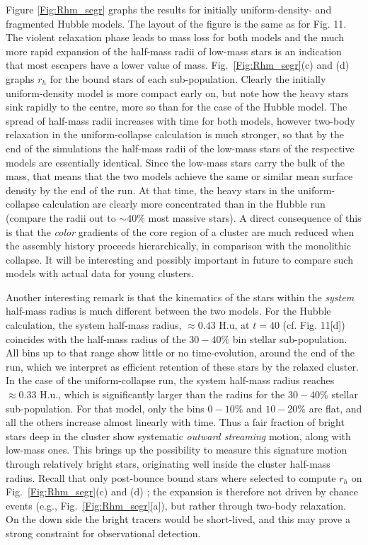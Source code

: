 Figure \ref{Fig:Rhm_segr} graphs the results for initially uniform-density- and fragmented Hubble models. The layout of the figure is the same as for Fig. 11. The violent relaxation phase leads to mass loss for both models and the much more rapid expansion of the half-mass radii of low-mass stars is an indication that most escapers have a lower value of mass. Fig.~\ref{Fig:Rhm_segr}(c) and (d) graphs $r_h$ for the bound stars of each sub-population. Clearly the initially uniform-density model is more compact early on, but note how the heavy stars sink rapidly to the centre, more so than for the case of the Hubble model. The spread of half-mass radii increases with time for both models, however two-body relaxation in the uniform-collapse calculation is much stronger, so that by the end of the simulations the half-mass radii of the low-mass stars of the respective models are essentially identical. Since the low-mass stars carry the bulk of the mass, that means that the two models achieve the same or similar mean surface density by the end of the run. At that time, the heavy stars in the uniform-collapse calculation are clearly more concentrated than in the Hubble run (compare the radii out to $\sim 40\%$ most massive stars). A direct consequence of this is that the {\it color} gradients of the core region of a cluster are much reduced when the assembly history proceeds hierarchically, in comparison with the monolithic collapse. It will be interesting and possibly important in future to compare such models with actual data for young clusters.

Another interesting remark is that the kinematics of the stars within the {\it system} half-mass radius is much different between the two models. For the Hubble calculation, the system half-mass radius, $ \approx 0.43 $ H.u, at $t = 40$ (cf. Fig. 11[d]) coincides with the half-mass radius of the $30-40\%$ bin stellar sub-population. All bins up to that range show little or no time-evolution, around the end of the run, which we interpret as efficient retention of these stars by the relaxed cluster. In the case of the uniform-collapse run, the system half-mass radius reaches $\approx 0.33$ H.u., which is significantly larger than the radius for the $30-40\%$ stellar sub-population. For that model, only the bins $0-10\%$ and $10-20\%$ are flat, and all the others increase almost linearly with time. Thus a fair fraction of bright stars deep in the cluster show systematic {\it outward streaming} motion, along with low-mass ones. This brings up the possibility to measure this signature motion through relatively bright stars, originating well inside the cluster half-mass radius. Recall that only post-bounce bound stars where selected to compute $r_h$ on Fig.~\ref{Fig:Rhm_segr}(c) and (d) ; the expansion is therefore not driven by chance events (e.g., Fig.~\ref{Fig:Rhm_segr}[a]), but rather through two-body relaxation. On the down side the bright tracers would be short-lived, and this may prove a strong constraint for observational detection.


